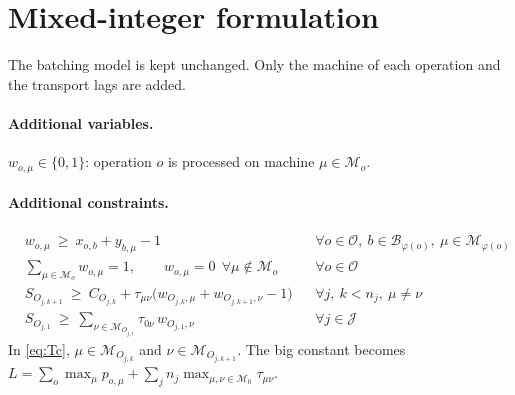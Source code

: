 \documentclass[11pt,a4paper]{article}
\newcommand{\Jset}{\mathcal{J}}
\newcommand{\Oset}{\mathcal{O}}
\newcommand{\Mset}{\mathcal{M}}
\newcommand{\Bset}{\mathcal{B}}
\begin{document}
\section{Mixed-integer formulation}
\label{sec:milp}

The batching model is kept unchanged. Only the machine of each operation and
the transport lags are added.

\paragraph{Additional variables.}
$w_{o,\mu}\in\{0,1\}$: operation $o$ is processed on machine $\mu\in\Mset_o$.

\paragraph{Additional constraints.}
\begin{align}
  & w_{o,\mu}\ \ge\ x_{o,b}+y_{b,\mu}-1
    && \forall o\in\Oset,\ b\in\Bset_{\varphi(o)},\ \mu\in\Mset_{\varphi(o)}
    \tag{T-a}\label{eq:Ta}\\
  & \textstyle\sum_{\mu\in\Mset_o} w_{o,\mu}=1,\qquad w_{o,\mu}=0\ \ \forall\mu\notin\Mset_o
    && \forall o\in\Oset
    \tag{T-b}\label{eq:Tb}\\
  & S_{O_{j,k+1}}\ \ge\ C_{O_{j,k}}+\tau_{\mu\nu}\bigl(w_{O_{j,k},\mu}+w_{O_{j,k+1},\nu}-1\bigr)
    && \forall j,\ k<n_j,\ \mu\neq\nu
    \tag{T-c}\label{eq:Tc}\\
  & S_{O_{j,1}}\ \ge\ \textstyle\sum_{\nu\in\Mset_{O_{j,1}}}\tau_{0\nu}\,w_{O_{j,1},\nu}
    && \forall j\in\Jset
    \tag{T-d}\label{eq:Td}
\end{align}
In \eqref{eq:Tc}, $\mu\in\Mset_{O_{j,k}}$ and $\nu\in\Mset_{O_{j,k+1}}$.
The big constant becomes
$L=\sum_{o}\max_\mu p_{o,\mu}+\sum_j n_j\max_{\mu,\nu\in\Mset_0}\tau_{\mu\nu}$.
\end{document}
